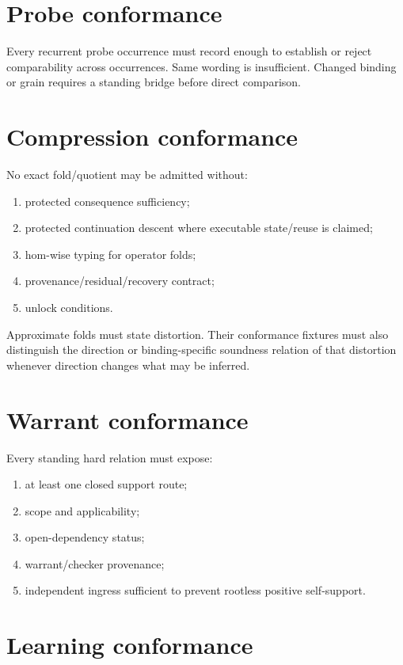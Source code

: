 \documentclass[11pt,oneside]{article}
\begin{document}
\section{Probe conformance}

Every recurrent probe occurrence must record enough to establish or reject comparability across occurrences.  Same wording is insufficient.  Changed binding or grain requires a standing bridge before direct comparison.

\section{Compression conformance}

No exact fold/quotient may be admitted without:
\begin{enumerate}
\item protected consequence sufficiency;
\item protected continuation descent where executable state/reuse is claimed;
\item hom-wise typing for operator folds;
\item provenance/residual/recovery contract;
\item unlock conditions.
\end{enumerate}

Approximate folds must state distortion.
Their conformance fixtures must also distinguish the direction or binding-specific
soundness relation of that distortion whenever direction changes what may be inferred.

\section{Warrant conformance}

Every standing hard relation must expose:
\begin{enumerate}
\item at least one closed support route;
\item scope and applicability;
\item open-dependency status;
\item warrant/checker provenance;
\item independent ingress sufficient to prevent rootless positive self-support.
\end{enumerate}

\section{Learning conformance}
\end{document}
